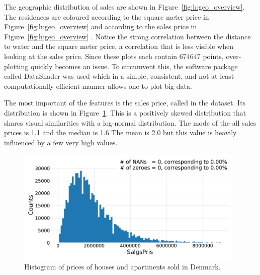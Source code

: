 The geographic distribution of sales are shown in Figure~\ref{fig:h:geo_overview}. The residences are coloured according to the square meter price in Figure~\ref{fig:h:geo_overview}  and according to the sales price in Figure~\ref{fig:h:geo_overview} . Notice the strong correlation between the distance to water and the square meter price, a correlation that is less visible when looking at the sales price. Since these plots each contain \num{674647} points, over-plotting quickly becomes an issue. To circumvent this, the software package called DataShader \autocite{bednarDatashaderRevealingStructure2019} was used which in a simple, consistent, and not at least computationally efficient manner allows one to plot big data.



The most important of the features is the sales price, called  in the dataset. Its distribution is shown in Figure~\ref{fig:h:price_overview_price}. This is a positively skewed distribution that shares visual similarities with a log-normal distribution. The mode of the all sales prices is \SI{1.1}{\Mkr} and the median is \SI{1.6}{\Mkr} The mean is \SI{2.0}{\Mkr} but this value is heavily influenced by a few very high values. 

\begin{figure}
  \includegraphics[width=0.98\textwidth, page=1, trim=15 15 15 15, clip]{figures/housing/overview_fig.pdf}
  \caption[Histogram of Prices of Houses and Apartments Sold in Denmark]
          {Histogram of prices of houses and apartments sold in Denmark.}
  \label{fig:h:price_overview_price}
\end{figure}

\vspace{-0.5cm}

